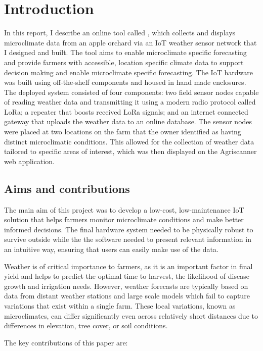 \section{Introduction}

In this report, I describe an online tool called \myReportTitle{}, which
collects and displays microclimate data from an apple orchard via an IoT weather
sensor network that I designed and built. The tool aims to enable microclimate
specific forecasting and provide farmers with accessible, location specific
climate data to support decision making and enable microclimate specific
forecasting. The IoT hardware was built using off-the-shelf components and
housed in hand made enclosures. The deployed system consisted of four
components: two field sensor nodes capable of reading weather data and
transmitting it using a modern radio protocol called LoRa; a repeater that
boosts received LoRa signals; and an internet connected gateway that uploads the
weather data to an online database. The sensor nodes were placed at two
locations on the farm that the owner identified as having distinct microclimatic
conditions. This allowed for the collection of weather data tailored to specific
areas of interest, which was then displayed on the Agriscanner web application.


\subsection{Aims and contributions}

The main aim of this project was to develop a low-cost, low-maintenance IoT
solution that helps farmers monitor microclimate conditions and make better
informed decisions. The final hardware system needed to be physically robust to
survive outside while the the software needed to present relevant information in
an intuitive way, ensuring that users can easily make use of the data.

Weather is of critical importance to farmers, as it is an important factor in
final yield and helps to predict the optimal time to harvest, the likelihood of
disease growth and irrigation needs. However, weather forecasts are typically
based on data from distant weather stations and large scale models which fail to
capture variations that exist within a single farm. These local variations,
known as microclimates, can differ significantly even across relatively short
distances due to differences in elevation, tree cover, or soil conditions.

The key contributions of this paper are:

